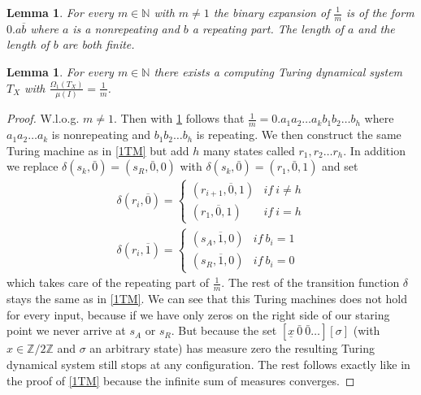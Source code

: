 \documentclass[12pt,a4paper]{scrartcl}
\newtheorem{Lemma}[Theorem]{Lemma}
\numberwithin{equation}{section}
\newcommand{\N}{\mathbb{N}} %
\newcommand{\2}{\mathbb{Z} / 2 \mathbb{Z}}
\newcommand{\1}{\bar{1}}
\newcommand{\0}{\bar{0}}
\begin{document}
\begin{Lemma} \label{frac}
	For every $m \in \N$ with $m \neq 1$ the binary expansion of $\frac{1}{m}$ is of the form $0. a \overline{b}$ where $a$ is a nonrepeating and $b$ a repeating part. The length of $a$ and the length of $b$ are both finite.
\end{Lemma}
\begin{Lemma} \label{2TM}
	For every $m \in \N$ there exists a computing Turing dynamical system $T_X$ with $\frac{\Omega_1(T_X)}{\mu(I)} = \frac{1}{m}$.
\end{Lemma}
\begin{proof}
	W.l.o.g. $m \neq 1$. Then with \ref{frac} follows that $\frac{1}{m} = 0.a_1a_2 \ldots a_k b_1 b_2 \ldots b_h$ where $a_1a_2 \ldots a_k$ is nonrepeating and $b_1 b_2 \ldots b_h$ is repeating. We then construct the same Turing machine as in \ref{1TM} but add $h$ many states called $r_1, r_2 \ldots r_h$. In addition we replace $\delta(s_k, \0) = (s_R, \0, 0)$ with $\delta(s_k, \0) = (r_1, \0, 1)$ and set
	\begin{align*}
		\delta(r_i, \overline{0}) = \begin{cases}
			(r_{i+1}, \overline{0}, 1) & if \ i \neq h \\
			(r_1, \overline{0}, 1) & if \ i = h
		\end{cases} \\
		\delta(r_i, \overline{1}) = \begin{cases}
			(s_A, \overline{1}, 0) & if \ b_i = 1 \\
			(s_R, \overline{1}, 0) & if \ b_i = 0
		\end{cases}
	\end{align*}
	which takes care of the repeating part of $\frac{1}{m}$. The rest of the transition function $\delta$ stays the same as in \ref{1TM}. We can see that this Turing machines does not hold for every input, because if we have only zeros on the right side of our staring point we never arrive at $s_A$ or $s_R$. But because the set $[\underline{x} \ \0 \ \0 \ldots][\sigma]$ (with $x \in \2$ and $\sigma$ an arbitrary state) has measure zero the resulting Turing dynamical system still stops at any configuration. The rest follows exactly like in the proof of \ref{1TM} because the infinite sum of measures converges.
\end{proof}
\end{document}
